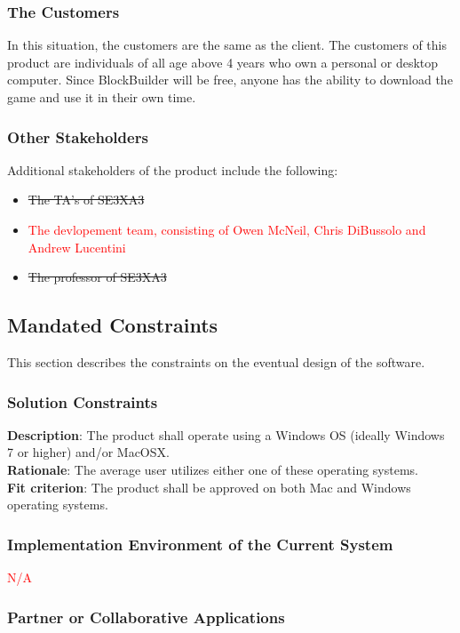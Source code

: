\documentclass[12pt, titlepage]{article}
\begin{document}
\subsubsection{The Customers}
In this situation, the customers are the same as the client. The customers of this product are individuals of all age above 4 years who own a personal or desktop computer. Since BlockBuilder will be free, anyone has the ability to download the game and use it in their own time.
\subsubsection{Other Stakeholders}
Additional stakeholders of the product include the following:
\begin{itemize}
\item \sout{The TA's of SE3XA3}
\item \textcolor{red}{The devlopement team, consisting of Owen McNeil, Chris DiBussolo and Andrew Lucentini}
\item \sout{The professor of SE3XA3}
\end{itemize}
\subsection{Mandated Constraints}
This section describes the constraints on the eventual design of the software.
\subsubsection{Solution Constraints}

\textbf{Description}: The product shall operate using a Windows OS (ideally Windows 7 or higher) and/or MacOSX.\\
\textbf{Rationale}: The average user utilizes either one of these operating systems.\\
\textbf{Fit criterion}: The product shall be approved on both Mac and Windows operating systems.
\subsubsection{Implementation Environment of the Current System}

\textcolor{red}{N/A}

\subsubsection{Partner or Collaborative Applications}
\end{document}
